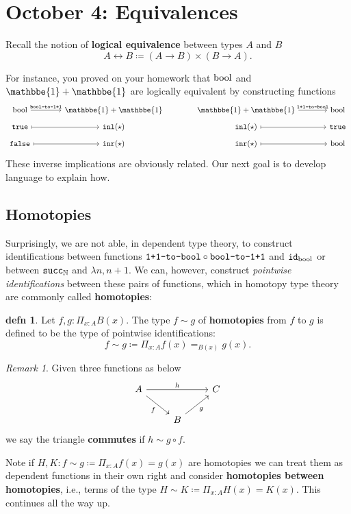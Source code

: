 \documentclass{amsart}
\theoremstyle{theorem}
\theoremstyle{definition}
\newtheorem*{defn}{defn}
\theoremstyle{remark}
\newtheorem*{rmk}{Remark}
\newcommand{\0}{\mathbbe{0}}
\newcommand{\1}{\mathbbe{1}}
\newcommand{\2}{\mathbbe{2}}
\newcommand{\3}{\mathbbe{3}}
\newcommand{\4}{\mathbbe{4}}
\newcommand{\term}[1]{{\textup{\texttt{#1}}}}
\newcommand{\type}[1]{{\textup{#1}}}
\newcommand{\id}{\term{id}}
\newcommand{\bN}{{\mathbb{N}}}
\newcommand{\suc}{\term{succ}_{\bN}}
\newcommand{\inl}{\term{inl}}
\newcommand{\inr}{\term{inr}}
\newcommand{\bool}{\type{bool}}
\newcommand{\true}{\term{true}}
\newcommand{\false}{\term{false}}
\begin{document}
\section*{October 4: Equivalences}

Recall the notion of \textbf{logical equivalence} between types $A$ and $B$
\[ A \leftrightarrow B \coloneq (A \to B) \times (B \to A).\]

For instance, you proved on your homework that $\bool$ and $\1+\1$ are logically equivalent by constructing functions
\[
\begin{tikzcd}[row sep=tiny, column sep=large] \bool \arrow[r, "{\term{bool-to-1+1}}"] & \1+\1 & \1+\1 \arrow[r, "\term{1+1-to-bool}"] & \bool \\
\true \arrow[r, mapsto] & \inl(\star) & \inl(\star) \arrow[r, mapsto] & \true \\ \false \arrow[r, mapsto] & \inr(\star) & \inr(\star) \arrow[r, mapsto] & \bool
\end{tikzcd}
\]
These inverse implications are obviously related. Our next goal is to develop language to explain how.

\subsection*{Homotopies}

Surprisingly, we are not able, in dependent type theory, to construct identifications between functions $\term{1+1-to-bool} \circ \term{bool-to-1+1}$ and $\id_\bool$ or between $\suc$ and $\lambda n, n+1$. We can, however, construct \emph{pointwise identifications} between these pairs of functions, which in homotopy type theory are commonly called \textbf{homotopies}:

\begin{defn} Let $f,g : \Pi_{x:A} B(x)$. The type $f\sim g$ of \textbf{homotopies} from $f$ to $g$ is defined to be the type of pointwise identifications:
\[ f \sim g\coloneq \Pi_{x :A} f(x) =_{B(x)} g(x).\]
\end{defn}

\begin{rmk} Given three functions as below
\[
\begin{tikzcd} A \arrow[rr, "h"] \arrow[dr, "f"'] & & C \\ & B \arrow[ur, "g"']
\end{tikzcd}
\]
we say the triangle \textbf{commutes} if $h\sim g \circ f$.
\end{rmk}

Note if $H, K : f \sim g \coloneq \Pi_{x :A} f(x) = g(x)$ are homotopies we can treat them as dependent functions in their own right and consider \textbf{homotopies between homotopies}, i.e., terms of the type $H \sim K \coloneq \Pi_{x :A} H(x) = K(x)$. This continues all the way up.
\end{document}
